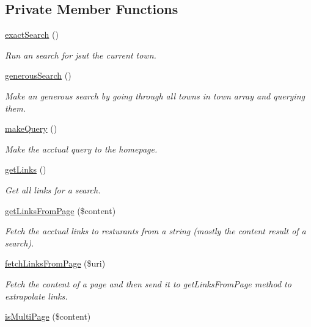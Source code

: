 \subsection*{Private Member Functions}
\begin{DoxyCompactItemize}
\item 
\hyperlink{class_search_a6469a0900a719795f117999646e78670}{exact\+Search} ()
\begin{DoxyCompactList}\small\item\em Run an search for jsut the current town. \end{DoxyCompactList}\item 
\hyperlink{class_search_ac7ab4b286f468dbc67184e3d8e2ec086}{generous\+Search} ()
\begin{DoxyCompactList}\small\item\em Make an generous search by going through all towns in town array and querying them. \end{DoxyCompactList}\item 
\hyperlink{class_search_aab0de7f1b256ebfc720a5c9a26c7a5e4}{make\+Query} ()
\begin{DoxyCompactList}\small\item\em Make the acctual query to the homepage. \end{DoxyCompactList}\item 
\hyperlink{class_search_ac74e4ae4005b43140ce27fa3be53803a}{get\+Links} ()
\begin{DoxyCompactList}\small\item\em Get all links for a search. \end{DoxyCompactList}\item 
\hyperlink{class_search_a0b07d40d538cc7c3f49e2906da900759}{get\+Links\+From\+Page} (\$content)
\begin{DoxyCompactList}\small\item\em Fetch the acctual links to resturants from a string (mostly the content result of a search). \end{DoxyCompactList}\item 
\hyperlink{class_search_a0ae3fdf6e8c01b665dbbfd3cb5afd82e}{fetch\+Links\+From\+Page} (\$uri)
\begin{DoxyCompactList}\small\item\em Fetch the content of a page and then send it to get\+Links\+From\+Page method to extrapolate links. \end{DoxyCompactList}\item 
\hyperlink{class_search_ada895dffcd96b9471758c63f17363df1}{is\+Multi\+Page} (\$content)

\end{DoxyCompactItemize}
